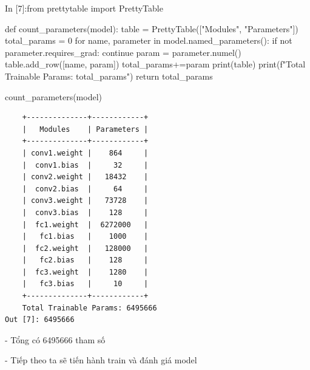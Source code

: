 \documentclass[12pt, a4paper]{article}
\begin{document}
\begin{python}
In [7]:from prettytable import PrettyTable
        
        def count_parameters(model):
            table = PrettyTable(["Modules", "Parameters"])
            total_params = 0
            for name, parameter in model.named_parameters():
                if not parameter.requires_grad: 
                    continue
                param = parameter.numel()
                table.add_row([name, param])
                total_params+=param
            print(table)
            print(f"Total Trainable Params: {total_params}")
            return total_params
        
        count_parameters(model)
\end{python}
\begin{verbatim}
    +--------------+------------+
    |   Modules    | Parameters |
    +--------------+------------+
    | conv1.weight |    864     |
    |  conv1.bias  |     32     |
    | conv2.weight |   18432    |
    |  conv2.bias  |     64     |
    | conv3.weight |   73728    |
    |  conv3.bias  |    128     |
    |  fc1.weight  |  6272000   |
    |   fc1.bias   |    1000    |
    |  fc2.weight  |   128000   |
    |   fc2.bias   |    128     |
    |  fc3.weight  |    1280    |
    |   fc3.bias   |     10     |
    +--------------+------------+
    Total Trainable Params: 6495666
Out [7]: 6495666
\end{verbatim}
\par - Tổng có 6495666 tham số
\vspace{0.5cm}
\par - Tiếp theo ta sẽ tiến hành train và đánh giá model
\newpage
\end{document}
